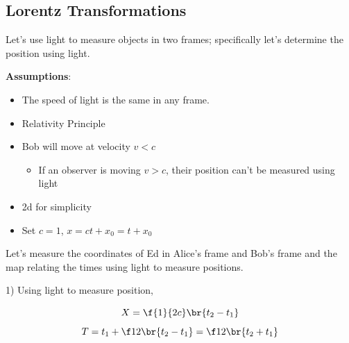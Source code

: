 \documentclass{article}
\newcommand{\heading}[1]{\vspace{0.1in}\textbf{#1}:}
\begin{document}
\subsection{Lorentz Transformations}

Let's use light to measure objects in two frames; specifically let's determine the position using light.

\heading{Assumptions}

\begin{itemize}
    \item The speed of light is the same in any frame.
    \item Relativity Principle
    \item Bob will move at velocity $v < c$
    \begin{itemize}
        \item If an observer is moving $v > c$, their position can't be measured using light
    \end{itemize}
    \item 2d for simplicity
    \item Set $c=1$, $x=ct + x_0 = t + x_0$
\end{itemize}

\begin{center}
\end{center}

Let's measure the coordinates of Ed in Alice's frame and Bob's frame and the map relating the times using light to measure positions.

1) Using light to measure position,

\[ X = \f{1}{2c}\br{t_2 - t_1} \]
\[ T = t_1 + \f12 \br{t_2 - t_1} = \f12 \br{t_2 + t_1} \]
\end{document}
